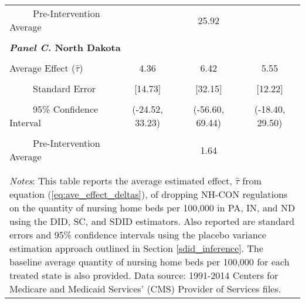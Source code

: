 \documentclass[../Main.tex]{subfiles}
\begin{document}
\begin{table}[htbp]
\begin{tabular}{l*{3}{c}}
\\[-2ex]
\multicolumn{1}{l}{\ \ \ \ \ Pre-Intervention Average}&   \multicolumn{3}{c}{25.92}\\
\\[-.1ex]
\multicolumn{4}{l}{\textbf{\textit{Panel C.} North Dakota}}\\
\\[-1.5ex]
\multicolumn{1}{l}{Average Effect ($\hat{\tau}$)}&   \multicolumn{1}{c}{4.36}&   \multicolumn{1}{c}{6.42}&  \multicolumn{1}{c}{5.55}\\
\\[-2ex]
\multicolumn{1}{l}{\ \ \ \ \ Standard Error}  &\multicolumn{1}{c}{[14.73]}&\multicolumn{1}{c}{[32.15]}&\multicolumn{1}{c}{[12.22]}\\
\\[-2ex]
\multicolumn{1}{l}{\ \ \ \ \ 95\% Confidence Interval}&   \multicolumn{1}{c}{(-24.52, 33.23)}&   \multicolumn{1}{c}{(-56.60, 69.44)}&   \multicolumn{1}{c}{(-18.40, 29.50)}\\
\\[-2ex]
\multicolumn{1}{l}{\ \ \ \ \ Pre-Intervention Average}&   \multicolumn{3}{c}{1.64}\\
\\[-.1ex]
\hline\hline
\\[-2ex]
\multicolumn{4}{p{.75\linewidth}}{\footnotesize \textit{Notes}: This table reports the average estimated effect, $\hat{\tau}$ from equation (\ref{eq:ave_effect_deltas}), of dropping NH-CON regulations on the quantity of nursing home beds per 100,000 in PA, IN, and ND using the DID, SC, and SDID estimators. Also reported are standard errors and 95\% confidence intervals using the placebo variance estimation approach outlined in Section \ref{sdid_inference}. The baseline average quantity of nursing home beds per 100,000 for each treated state is also provided. Data source: 1991-2014 Centers for Medicare and Medicaid Services’ (CMS) Provider of Services files.}
\end{tabular}
\end{table}
\vfill
\clearpage
\end{document}

